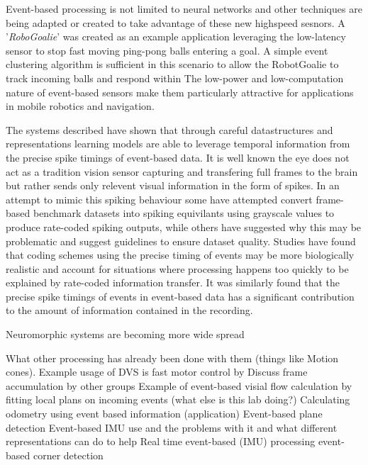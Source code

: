 Event-based processing is not limited to neural networks and other techniques are being adapted or created to take advantage of these new highspeed sesnors\cite{ni2015visual}.
A '\textit{RoboGoalie}' was created as an example application leveraging the low-latency sensor to stop fast moving ping-pong balls entering a goal\cite{delbruck2007fast}. 
A simple event clustering algorithm is sufficient in this scenario to allow the RobotGoalie to track incoming balls and respond within 
The low-power and low-computation nature of event-based sensors make them particularly attractive for applications in mobile robotics and navigation\cite{weikersdorfer2013simultaneous, milford2015place}.


The systems described have shown that through careful datastructures and representations learning models are able to leverage temporal information from the precise spike timings of event-based data. 
It is well known the eye does not act as a tradition vision sensor capturing and transfering full frames to the brain but rather sends only relevent visual information in the form of spikes\cite{delbruck2010activity}.
In an attempt to mimic this spiking behaviour some have attempted convert frame-based benchmark datasets into spiking equivilants using grayscale values to produce rate-coded spiking outputs, while others have suggested why this may be problematic \cite{akolkar2015can} and suggest guidelines to ensure dataset quality\cite{tan2015benchmarking}.
Studies have found that coding schemes using the precise timing of events may be more biologically realistic and account for situations where processing happens too quickly to be explained by rate-coded information transfer\cite{thorpe2001spike}. 
It was similarly found that the precise spike timings of events in event-based data has a significant contribution to the amount of information contained in the recording\cite{akolkar2015can}.







Neuromorphic systems are becoming more wide spread \cite{delbruck2014research}

What other processing has already been done with them (things like Motion cones). 
Example usage of DVS is fast motor control by \cite{delbruck2007fast}
Discuss frame accumulation by other groups
Example of event-based visial flow calculation by fitting local plans on incoming events\cite{benosman2014event} (what else is this lab doing?)
Calculating odometry using event based information (application) \cite{censi2014low}
Event-based plane detection \cite{afshar2016investigation}
Event-based IMU use and the problems with it and what different representations can do to help\cite{fida2015pre}
Real time event-based (IMU) processing \cite{fida2015real}
event-based corner detection\cite{clady2015asynchronous}


